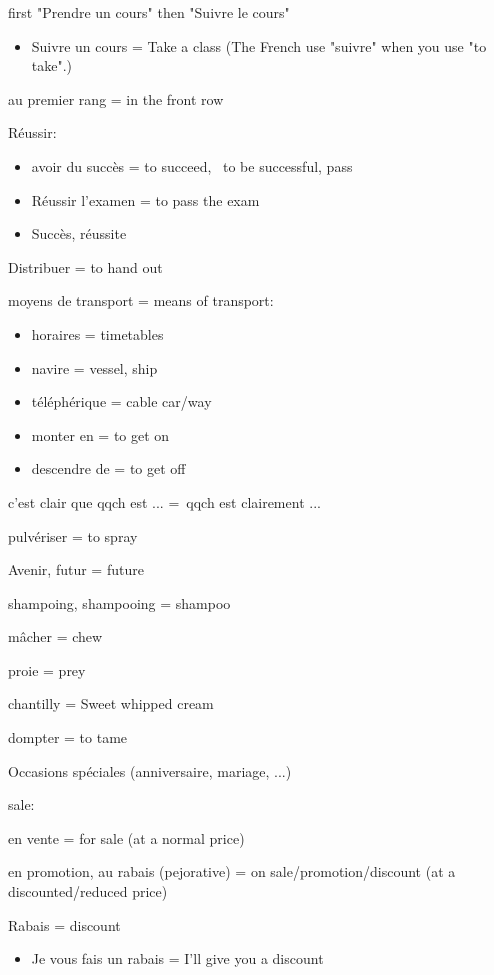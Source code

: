 {first "Prendre un cours" then "Suivre le cours"}

\begin{itemize}
\item
  {Suivre un cours = Take a class (The French use "suivre" when you use
  "to take".)}
\end{itemize}

{au premier rang = in the front row}

{Réussir:}

\begin{itemize}
\item
  {avoir du succès = to succeed,~ to be successful, pass}
\item
  {Réussir l'examen = to pass the exam}
\item
  {Succès, réussite~}
\end{itemize}

{Distribuer = to hand out}

moyens de transport = means of transport:

\begin{itemize}
\item
  horaires = timetables
\item
  navire = vessel, ship
\item
  téléphérique = cable car/way
\item
  monter en = to get on
\item
  descendre de = to get off
\end{itemize}

c'est clair que qqch est ... =~qqch est clairement ...

pulvériser = to spray

Avenir, futur = future~

shampoing, shampooing = shampoo

mâcher = chew

proie = prey

chantilly = Sweet whipped cream

dompter = to tame

Occasions spéciales (anniversaire, mariage, ...)

sale:

en vente = for sale (at a normal price)

en promotion, au rabais (pejorative) = on sale/promotion/discount (at a
discounted/reduced price)

Rabais = discount~

\begin{itemize}
\item
  Je vous fais un rabais = I'll give you a discount~
\end{itemize}

